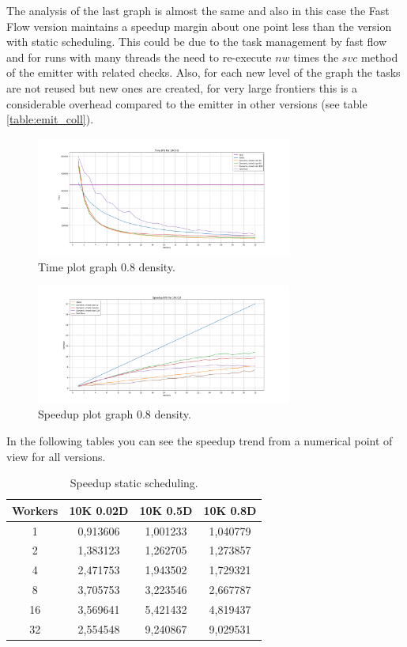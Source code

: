 The analysis of the last graph is almost the same and also in this case the Fast Flow version maintains a speedup margin about one point less than the version with static scheduling. This could be due to the task management by fast flow and for runs with many threads the need to re-execute $nw$ times the $svc$ method of the emitter with related checks. Also, for each new level of the graph the tasks are not reused but new ones are created, for very large frontiers this is a considerable overhead compared to the emitter in other versions (see table \ref{table:emit_coll}).

\begin{figure}[htb!]
    \centering
    \includegraphics[width=0.75\textwidth]{Figures/plot_map_time_vs10K08.png}
    \caption{Time plot graph 0.8 density.}
    \label{fig:plot_time_10k_08}
\end{figure}
\FloatBarrier

\begin{figure}[htb!]
    \centering
    \includegraphics[width=0.75\textwidth]{Figures/plot_map_speedup_vs10K08.png}
    \caption{Speedup plot graph 0.8 density.}
    \label{fig:plot_speedup_10k_08}
\end{figure}
\FloatBarrier
In the following tables you can see the speedup trend from a numerical point of view for all versions.
\begin{table}[htb!]
\centering
\begin{tabular}{|c|c|c|c|}
\hline
Workers & 10K 0.02D & 10K 0.5D & 10K 0.8D \\ \hline
1       & 0,913606  & 1,001233 & 1,040779 \\ \hline
2       & 1,383123  & 1,262705 & 1,273857 \\ \hline
4       & 2,471753  & 1,943502 & 1,729321 \\ \hline
8       & 3,705753  & 3,223546 & 2,667787 \\ \hline
16      & 3,569641  & 5,421432 & 4,819437 \\ \hline
32      & 2,554548  & 9,240867 & 9,029531 \\ \hline
\end{tabular}
\caption{Speedup static scheduling.}
\label{table:spup_static}
\end{table}
\FloatBarrier

